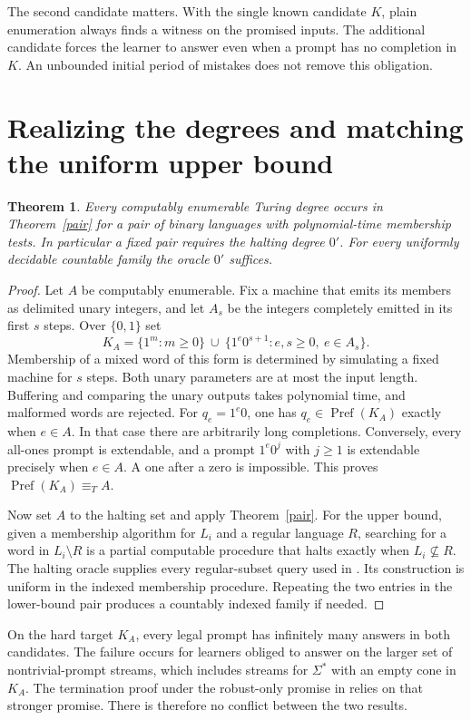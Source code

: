 \documentclass[11pt]{article}
\newtheorem{theorem}{Theorem}
\newcommand{\Pref}{\operatorname{Pref}}
\newcommand{\Full}{\Sigma^*}
\begin{document}
The second candidate matters. With the single known candidate $K$, plain enumeration always finds a witness on the promised inputs. The additional candidate forces the learner to answer even when a prompt has no completion in $K$. An unbounded initial period of mistakes does not remove this obligation.

\section{Realizing the degrees and matching the uniform upper bound}
\begin{theorem}\label{degree}
Every computably enumerable Turing degree occurs in Theorem~\ref{pair} for a pair of binary languages with polynomial-time membership tests. In particular a fixed pair requires the halting degree $0'$. For every uniformly decidable countable family the oracle $0'$ suffices.
\end{theorem}
\begin{proof}
Let $A$ be computably enumerable. Fix a machine that emits its members as delimited unary integers, and let $A_s$ be the integers completely emitted in its first $s$ steps. Over $\{0,1\}$ set
\[
 K_A=\{1^m:m\ge0\}\ \cup\
       \{1^e0^{s+1}:e,s\ge0,\ e\in A_s\}.
\]
Membership of a mixed word of this form is determined by simulating a fixed machine for $s$ steps. Both unary parameters are at most the input length. Buffering and comparing the unary outputs takes polynomial time, and malformed words are rejected. For $q_e=1^e0$, one has $q_e\in\Pref(K_A)$ exactly when $e\in A$. In that case there are arbitrarily long completions. Conversely, every all-ones prompt is extendable, and a prompt $1^e0^j$ with $j\ge1$ is extendable precisely when $e\in A$. A one after a zero is impossible. This proves $\Pref(K_A)\equiv_T A$.

Now set $A$ to the halting set and apply Theorem~\ref{pair}. For the upper bound, given a membership algorithm for $L_i$ and a regular language $R$, searching for a word in $L_i\setminus R$ is a partial computable procedure that halts exactly when $L_i\not\subseteq R$. The halting oracle supplies every regular-subset query used in \cite[Theorem 7.5]{km}. Its construction is uniform in the indexed membership procedure. Repeating the two entries in the lower-bound pair produces a countably indexed family if needed.
\end{proof}

On the hard target $K_A$, every legal prompt has infinitely many answers in both candidates. The failure occurs for learners obliged to answer on the larger set of nontrivial-prompt streams, which includes streams for $\Full$ with an empty cone in $K_A$. The termination proof under the robust-only promise in \cite{km} relies on that stronger promise. There is therefore no conflict between the two results.
\end{document}
